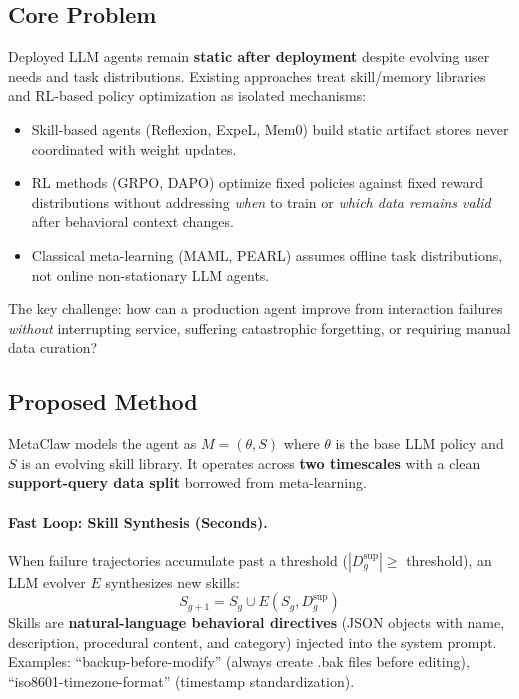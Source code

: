 \documentclass[11pt]{article}
\begin{document}
\subsection{Core Problem}

Deployed LLM agents remain \textbf{static after deployment} despite evolving user needs and task distributions.
Existing approaches treat skill/memory libraries and RL-based policy optimization as isolated mechanisms:
\begin{itemize}
    \item Skill-based agents (Reflexion, ExpeL, Mem0) build static artifact stores never coordinated with weight updates.
    \item RL methods (GRPO, DAPO) optimize fixed policies against fixed reward distributions without addressing \emph{when} to train or \emph{which data remains valid} after behavioral context changes.
    \item Classical meta-learning (MAML, PEARL) assumes offline task distributions, not online non-stationary LLM agents.
\end{itemize}

The key challenge: how can a production agent improve from interaction failures \emph{without} interrupting service, suffering catastrophic forgetting, or requiring manual data curation?

\subsection{Proposed Method}

MetaClaw models the agent as $M = (\theta, S)$ where $\theta$ is the base LLM policy and $S$ is an evolving skill library.
It operates across \textbf{two timescales} with a clean \textbf{support-query data split} borrowed from meta-learning.

\paragraph{Fast Loop: Skill Synthesis (Seconds).}
When failure trajectories accumulate past a threshold ($|D^{\mathrm{sup}}_g| \geq$ threshold), an LLM evolver $E$ synthesizes new skills:
\[
S_{g+1} = S_g \cup E(S_g, D^{\mathrm{sup}}_g)
\]
Skills are \textbf{natural-language behavioral directives} (JSON objects with name, description, procedural content, and category) injected into the system prompt.
Examples: ``backup-before-modify'' (always create .bak files before editing), ``iso8601-timezone-format'' (timestamp standardization).
\end{document}
